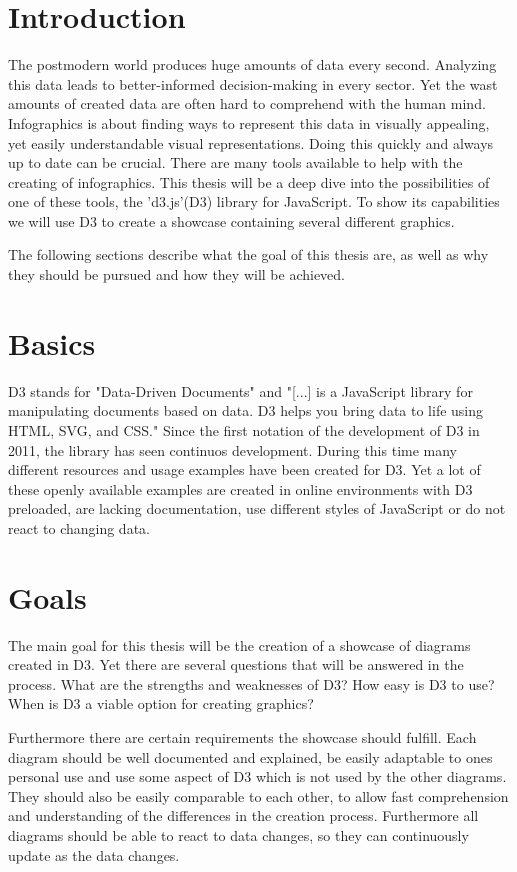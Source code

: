 \documentclass[
a4paper,     %
12pt         %
]{scrartcl}  %
\begin{document}
\section{Introduction}
The postmodern world produces huge amounts of data every second. Analyzing this data leads to better-informed decision-making in every sector. Yet the wast amounts of created data are often hard to comprehend with the human mind. Infographics is about finding ways to represent this data in visually appealing, yet easily understandable visual representations. Doing this quickly and always up to date can be crucial. There are many tools available to help with the creating of infographics. This thesis will be a deep dive into the possibilities of one of these tools, the 'd3.js'(D3) library for JavaScript. To show its capabilities we will use D3 to create a showcase containing several different graphics.

The following sections describe what the goal of this thesis are, as well as why they should be pursued and how they will be achieved.

\section{Basics}
D3 stands for "Data-Driven Documents" and "[...] is a JavaScript library for manipulating documents based on data. D3 helps you bring data to life using HTML, SVG, and CSS." \cite{d3js}
Since the first notation of the development of D3 in 2011, the library has seen continuos development. During this time many different resources and usage examples have been created for D3. Yet a lot of these openly available examples are created in online environments with D3 preloaded, are lacking documentation, use different styles of JavaScript or do not react to changing data.

\section{Goals}
The main goal for this thesis will be the creation of a showcase of diagrams created in D3. Yet there are several questions that will be answered in the process. What are the strengths and weaknesses of D3? How easy is D3 to use? When is D3 a viable option for creating graphics?

Furthermore there are certain requirements the showcase should fulfill. Each diagram should be well documented and explained, be easily adaptable to ones personal use and use some aspect of D3 which is not used by the other diagrams. They should also be easily comparable to each other, to allow fast comprehension and understanding of the differences in the creation process. Furthermore all diagrams should be able to react to data changes, so they can continuously update as the data changes.
\end{document}
